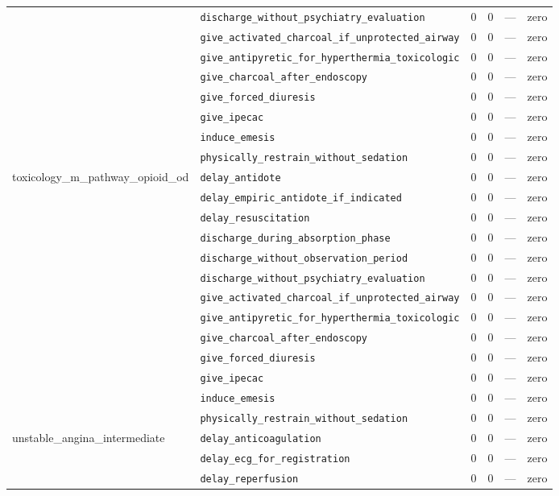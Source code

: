 \begin{table}[ht]
\begin{tabular}{llrrrl}
 & \texttt{discharge\_without\_psychiatry\_evaluation} & 0 & 0 & — & zero \\
 & \texttt{give\_activated\_charcoal\_if\_unprotected\_airway} & 0 & 0 & — & zero \\
 & \texttt{give\_antipyretic\_for\_hyperthermia\_toxicologic} & 0 & 0 & — & zero \\
 & \texttt{give\_charcoal\_after\_endoscopy} & 0 & 0 & — & zero \\
 & \texttt{give\_forced\_diuresis} & 0 & 0 & — & zero \\
 & \texttt{give\_ipecac} & 0 & 0 & — & zero \\
 & \texttt{induce\_emesis} & 0 & 0 & — & zero \\
 & \texttt{physically\_restrain\_without\_sedation} & 0 & 0 & — & zero \\
\midrule
toxicology\_m\_pathway\_opioid\_od & \texttt{delay\_antidote} & 0 & 0 & — & zero \\
 & \texttt{delay\_empiric\_antidote\_if\_indicated} & 0 & 0 & — & zero \\
 & \texttt{delay\_resuscitation} & 0 & 0 & — & zero \\
 & \texttt{discharge\_during\_absorption\_phase} & 0 & 0 & — & zero \\
 & \texttt{discharge\_without\_observation\_period} & 0 & 0 & — & zero \\
 & \texttt{discharge\_without\_psychiatry\_evaluation} & 0 & 0 & — & zero \\
 & \texttt{give\_activated\_charcoal\_if\_unprotected\_airway} & 0 & 0 & — & zero \\
 & \texttt{give\_antipyretic\_for\_hyperthermia\_toxicologic} & 0 & 0 & — & zero \\
 & \texttt{give\_charcoal\_after\_endoscopy} & 0 & 0 & — & zero \\
 & \texttt{give\_forced\_diuresis} & 0 & 0 & — & zero \\
 & \texttt{give\_ipecac} & 0 & 0 & — & zero \\
 & \texttt{induce\_emesis} & 0 & 0 & — & zero \\
 & \texttt{physically\_restrain\_without\_sedation} & 0 & 0 & — & zero \\
\midrule
unstable\_angina\_intermediate & \texttt{delay\_anticoagulation} & 0 & 0 & — & zero \\
 & \texttt{delay\_ecg\_for\_registration} & 0 & 0 & — & zero \\
 & \texttt{delay\_reperfusion} & 0 & 0 & — & zero \\

\end{tabular}
\end{table}
